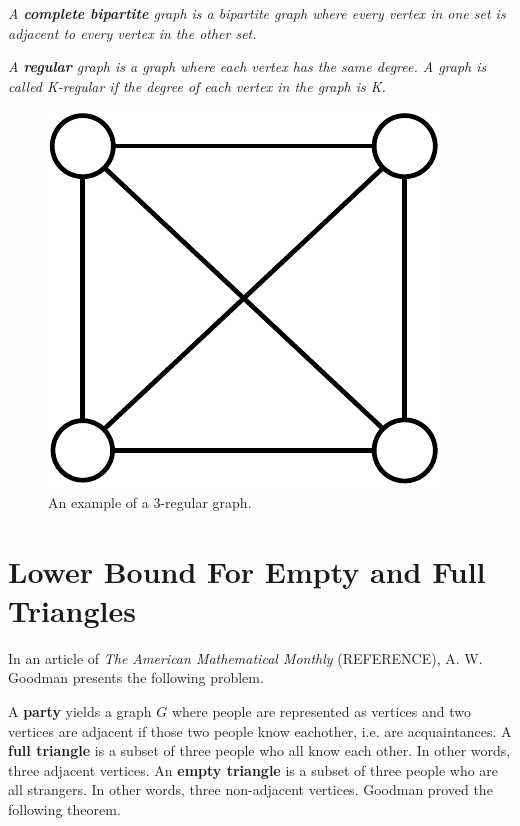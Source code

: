 \documentclass[10pt]{amsart}
\begin{document}
 \emph{A \textbf{complete bipartite} graph is a bipartite graph where every 
vertex in one set is adjacent to every vertex in the other set.}

 \emph{A \textbf{regular} graph is a graph where each vertex has the same 
degree. A graph is called K-regular if the degree of each vertex in the graph is K.}
\begin{figure}[h!]
    \centering
    \includegraphics[scale=.4]{../figures/regular_graph.pdf}
    \caption{An example of a 3-regular graph.}
\end{figure}




\section{Lower Bound For Empty and Full Triangles}

In an article of \emph{The American Mathematical Monthly} (REFERENCE), A. W. Goodman presents the 
following problem.

A \textbf{party} yields a graph $G$ where people are represented as vertices and two vertices are 
adjacent if those two people know eachother, i.e. are acquaintances.
A \textbf{full triangle} is a subset of three people who all know each other. In other words, three 
adjacent vertices.
An \textbf{empty triangle} is a subset of three people who are all strangers. In other words, three
non-adjacent vertices. Goodman proved the following theorem.
\end{document}
